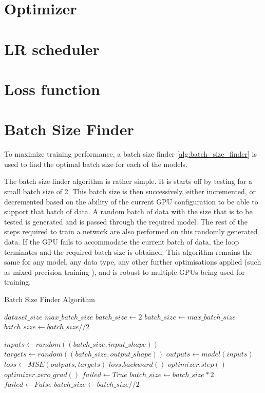 \section{Optimizer}
\section{LR scheduler}
\section{Loss function}
\section{Batch Size Finder}
To maximize training performance, a batch size finder \ref{alg:batch_size_finder} is used to find the optimal batch size for each of the models.

The batch size finder algorithm is rather simple. It is starts off by testing for a small batch size of 2. This batch size is then successively, either incremented, or decremented based on the ability of the current GPU configuration to be able to support that batch of data. 
A random batch of data with the size that is to be tested is generated and is passed through the required model. The rest of the steps required to train a network are also performed on this randomly generated data. If the GPU fails to accommodate the current batch of data, the loop terminates and the required batch size is obtained.
This algorithm remains the same for any model, any data type, any other further optimisations applied (such as mixed precision training \cite{micikeviciusMixedPrecisionTraining2017}), and is robust to multiple GPUs being used for training.
\begin{algorithm}
    \caption{Batch Size Finder Algorithm}
    \label{alg:batch_size_finder}
    \begin{algorithmic}
        \REQUIRE $dataset\_size$
        \REQUIRE $max\_batch\_size$
        \STATE $batch\_size \leftarrow 2$
        \STATE $batch\_size \leftarrow max\_batch\_size$
        \ENDIF
        \STATE $batch\_size \leftarrow batch\_size // 2$
        \ENDIF

        \LOOP
        \STATE $inputs \leftarrow random((batch\_size,input\_shape))$
        \STATE $targets \leftarrow random((batch\_size,output\_shape))$
        \STATE $outputs \leftarrow model(inputs)$
        \STATE $loss \leftarrow MSE(outputs, targets)$
        \STATE $loss.backward()$
        \STATE $optimizer.step()$
        \STATE $optimizer.zero\_grad()$
        \STATE $failed \leftarrow True$
        \STATE $batch\_size \leftarrow batch\_size * 2$
        \ENDLOOP
        \STATE $failed \leftarrow False$
        \STATE $batch\_size \leftarrow batch\_size // 2$
        \ENDIF

        \ENDWHILE

    \end{algorithmic}
\end{algorithm}

